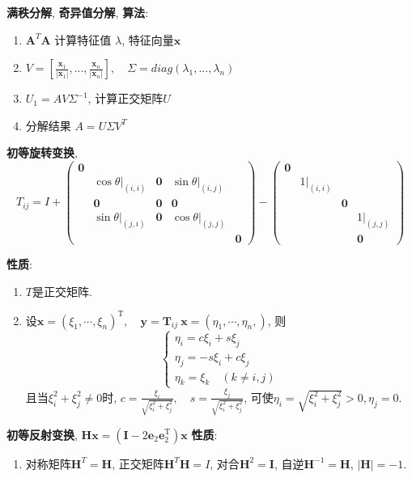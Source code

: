 \documentclass{article}
\newcommand{\env}[2]{\begin{#1}#2\end{#1}}
\newcommand{\defi}[2]{\textbf{#1}, #2}
\newcommand{\bb}{\boldsymbol}
\begin{document}
    \defi{满秩分解}{}
    \defi{奇异值分解}{}
        \textbf{算法}: \env{enumerate}{
            \item $\bb A^T \bb A$ 计算特征值 $\lambda$, 特征向量$\bb x$
            \item $V = \left[ \frac{\bb x_1}{|\bb x_1|}, ... ,\frac{\bb x_n}{|\bb x_n|} \right], \quad \Sigma = diag(\lambda_1, ... ,\lambda_n)$
            \item $U_1 = A V \Sigma^{-1}$, 计算正交矩阵$U$
            \item 分解结果 $A = U \Sigma V^T$
        }


    \defi{初等旋转变换}{
        \[T_{ij} = I + \begin{pmatrix}\mathbf 0\\ & \cos\theta|_{(i,i)}& \mathbf 0 & \sin\theta|_{(i,j)}& \\ & \mathbf 0&\mathbf 0&\mathbf 0\\& \sin\theta|_{(j,i)}& \mathbf 0 & \cos\theta|_{(j,j)}\\ &&&&\mathbf 0\end{pmatrix} - \begin{pmatrix}\mathbf 0\\ &1|_{(i,i)}\\&&\mathbf 0\\&&& 1 |_{(j,j)}\\& &&\mathbf 0\end{pmatrix}\]
    }
        \textbf{性质}: \env{enumerate}{
            \item $T$是正交矩阵.
            \item 设$\bb{x}=\left(\xi_{1}, \cdots, \xi_{n}\right)^{\mathrm{T}}, \quad \bb{y}=\bb{T}_{ij}\ \bb{x}=\left(\eta_{1}, \cdots, \eta_{n},\right)$, 则
                \[\left\{\begin{array}{l}
                \eta_{i}=c \xi_{i}+s \xi_{j} \\
                \eta_{j}=-s \xi_{i}+c \xi_{j} \\
                \eta_{k}=\xi_{k} \quad(k \neq i, j)
                \end{array}\right.\]
            且当$\xi_{i}^{2}+\xi_{j}^{2} \neq 0$时, $c=\frac{\xi_{i}}{\sqrt{\xi_{i}^{2}+\xi_{j}^{2}}}, \quad s=\frac{\xi_{j}}{\sqrt{\xi_{i}^{2}+\xi_{j}^{2}}}$, 可使$\eta_{i}=\sqrt{\xi_{i}^{2}+\xi_{j}^{2}}>0, \eta_{j}=0$.
        }

    \defi{初等反射变换}{$\bb{H} \bb{x} = \left(\bb{I}-2 \bb{e}_{2} \bb{e}_{2}^{\mathrm{T}}\right) \bb{x}$}
        \textbf{性质}: \env{enumerate}{
            \item 对称矩阵$\bb H^T = \bb H$, 正交矩阵$\bb H^T \bb H = I$, 对合$\bb H^2 = \bb I$, 自逆$\bb H^{-1} = \bb H$, $|\bb H| = -1$.
        }
\end{document}
